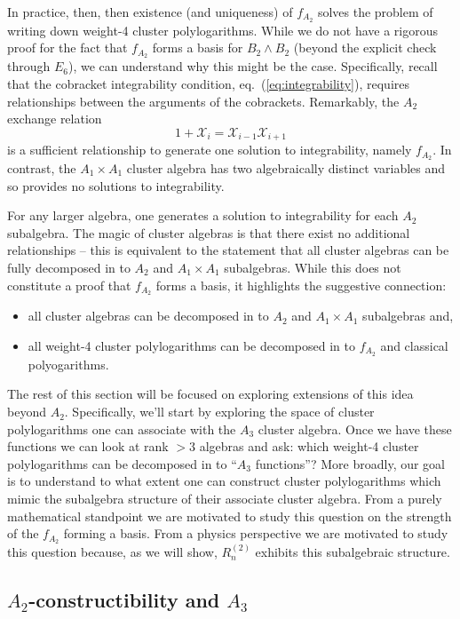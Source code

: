 \documentclass[11pt]{article}
\def\x{\mathcal{X}}
\def\pdfeq#1{\texorpdfstring{$#1$}{a}}
\begin{document}
In practice, then, then existence (and uniqueness) of $f_{A_2}$ solves the problem of writing down weight-4 cluster polylogarithms. While we do not have a rigorous proof for the fact that $f_{A_2}$ forms a basis for $B_2 \wedge B_2$ (beyond the explicit check through $E_6$), we can understand why this might be the case. Specifically, recall that the cobracket integrability condition, eq.~(\ref{eq:integrability}), requires relationships between the arguments of the cobrackets. Remarkably, the $A_2$ exchange relation
\begin{equation}
	1+\x_i = \x_{i-1}\x_{i+1}
\end{equation}
is a sufficient relationship to generate one solution to integrability, namely $f_{A_2}$. In contrast, the $A_1\times A_1$ cluster algebra has two algebraically distinct variables and so provides no solutions to integrability. 

For any larger algebra, one generates a solution to integrability for each $A_2$ subalgebra. The magic of cluster algebras is that there exist no additional relationships -- this is equivalent to the statement that all cluster algebras can be fully decomposed in to $A_2$ and $A_1 \times A_1$ subalgebras. While this does not constitute a proof that $f_{A_2}$ forms a basis, it highlights the suggestive connection:
\begin{itemize}
	\item all cluster algebras can be decomposed in to  $A_2$ and $A_1\times A_1$ subalgebras and,
	\item all weight-4 cluster polylogarithms can be decomposed in to $f_{A_2}$ and classical polyogarithms. 
\end{itemize}
The rest of this section will be focused on exploring extensions of this idea beyond $A_2$. Specifically, we'll start by exploring the space of cluster polylogarithms one can associate with the $A_3$ cluster algebra. Once we have these functions we can look at rank $>3$ algebras and ask: which weight-4 cluster polylogarithms can be decomposed in to ``$A_3$ functions''? More broadly, our goal is to understand to what extent one can construct cluster polylogarithms which mimic the subalgebra structure of their associate cluster algebra. From a purely mathematical standpoint we are motivated to study this question on the strength of the $f_{A_2}$ forming a basis. From a physics perspective we are motivated to study this question because, as we will show, $R^{(2)}_n$ exhibits this subalgebraic structure. 

\subsection{\pdfeq{A_2}-constructibility and \pdfeq{A_3}}
\end{document}
